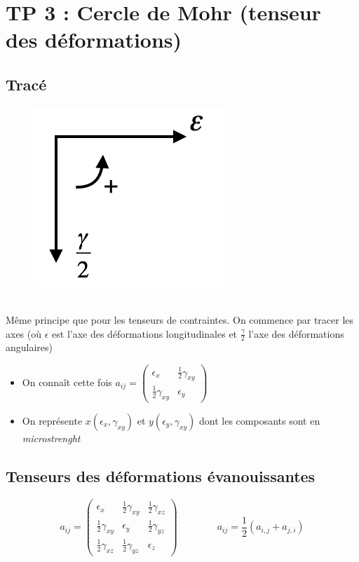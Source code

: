 \section*{TP 3 : Cercle de Mohr (tenseur des déformations)}
\subsection*{Tracé}

\begin{figure}
\includegraphics[scale=0.5]{TP3-1}
\end{figure}	
	\ \\ Même principe que pour les tenseurs de contraintes. On commence par tracer les axes (où $\epsilon$ est l'axe des déformations longitudinales et $\frac{\gamma}{2}$ l'axe des déformations angulaires)

\begin{itemize}	
	\item On connaît cette fois $a_{ij} = 
	\left(	
	\begin{array}{cc}
	\epsilon _x & \frac{1}{2}\gamma _{xy} \\ 
	\frac{1}{2}\gamma _{xy} & \epsilon _y
	\end{array}
	\right) $
	
	\item On représente $x(\epsilon _x,\gamma _{xy})$ et $y(\epsilon _y ,\gamma _{xy})$ dont les composants sont en \textit{microstrenght}
\end{itemize}

\subsection*{Tenseurs des déformations évanouissantes}
\begin{equation}
a_ {ij} = 
\left(
\begin{array}{ccc}
\epsilon _x & \frac{1}{2}\gamma _{xy} & \frac{1}{2}\gamma _{xz} \\ 
\frac{1}{2}\gamma _{xy} & \epsilon _y & \frac{1}{2}\gamma _{yz} \\ 
\frac{1}{2}\gamma _{xz} & \frac{1}{2}\gamma _{yz} & \epsilon _z
\end{array} 
\right)
\qquad \qquad
a_{ij} = \frac{1}{2}(a_{i,j} + a_{j,i})
\end{equation}

